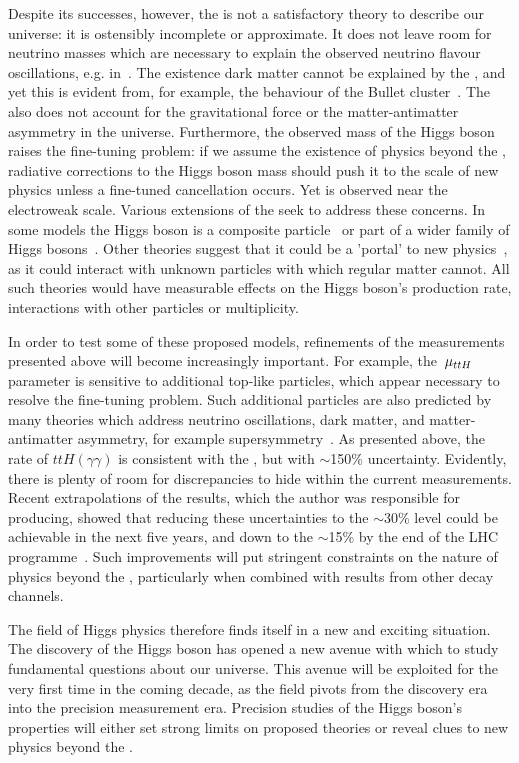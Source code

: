 Despite its successes, however, the \SM is not a satisfactory theory to describe our universe: it is ostensibly incomplete or approximate. It does not leave room for neutrino masses which are necessary to explain the observed neutrino flavour oscillations, e.g. in~\cite{DayaBay}. The existence dark matter cannot be explained by the \SM, and yet this is evident from, for example, the behaviour of the Bullet cluster~\cite{1538-4357-648-2-L109}. The \SM also does not account for the gravitational force or the matter-antimatter asymmetry in the universe. Furthermore, the observed mass of the Higgs boson raises the fine-tuning problem: if we assume the existence of physics beyond the \SM, radiative corrections to the Higgs boson mass should push it to the scale of new physics unless a fine-tuned cancellation occurs. Yet \mH is observed near the electroweak scale. Various extensions of the \SM seek to address these concerns. In some models the Higgs boson is a composite particle~\cite{Agashe:2004rs} or part of a wider family of Higgs bosons~\cite{Craig:2013hca}. Other theories suggest that it could be a 'portal' to new physics~\cite{Patt:2006fw}, as it could interact with unknown particles with which regular matter cannot. All such theories would have measurable effects on the Higgs boson's production rate, interactions with other particles or multiplicity. 

In order to test some of these proposed models, refinements of the measurements presented above will become increasingly important. 
For example, the $\,\mu_{ttH}$ parameter is sensitive to additional top-like particles, which appear necessary to resolve the fine-tuning problem. Such additional particles are also predicted by many theories which address neutrino oscillations, dark matter, and matter-antimatter asymmetry, for example supersymmetry~\cite{Martin:1997ns}.  
As presented above, the rate of $ttH (\gamma \gamma)$ is consistent with the \SM, but with $\sim$150\% uncertainty. Evidently, there is plenty of room for discrepancies to hide within the current measurements. Recent extrapolations of the \CMS results, which the author was responsible for producing, showed that reducing these uncertainties to the $\sim$30\% level could be achievable in the next five years, and down to the $\sim$15\% by the end of the LHC programme~\cite{CMS-DP-2016-064}. Such improvements will put stringent constraints on the nature of physics beyond the \SM, particularly when combined with results from other decay channels. 

The field of Higgs physics therefore finds itself in a new and exciting situation. The discovery of the Higgs boson has opened a new avenue with which to study fundamental questions about our universe. This avenue will be exploited for the very first time in the coming decade, as the field pivots from the discovery era into the precision measurement era. Precision studies of the Higgs boson's properties will either set strong limits on proposed theories or reveal clues to new physics beyond the \SM. 

